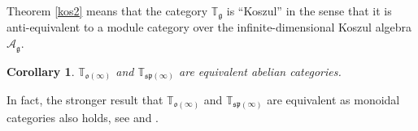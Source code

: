 \documentclass[10pt]{amsart}
\newcounter{theorem}
\newtheorem{corollary}[theo]{Corollary}
\newtheorem{prop}[theo]{Proposition}
\renewenvironment{proof}{ \emph{Proof}}{$\Box$}
\newcommand{\TT}{\mathbb{T}}
\renewcommand{\sp}{\mathfrak{sp}}
\renewcommand{\sl}{\mathfrak{sl}}
\newcommand{\oo}{\mathfrak{o}}
\newcommand{\hh}{\mathfrak{h}}
\renewcommand{\gg}{\mathfrak{g}}
\renewcommand {\phi} {\varphi}
\begin{document}
Theorem \ref{kos2} means that the category $\TT_\gg$ is ``Koszul'' in the sense that it is anti-equivalent to a module category over the infinite-dimensional 
Koszul algebra $\mathcal{A}_\gg$. 

\begin{corollary}
$\TT_{\oo(\infty)}$ and  $\TT_{\sp(\infty)}$ are equivalent abelian categories.
\end{corollary}

In fact, the stronger result that $\TT_{\oo(\infty)}$ and  $\TT_{\sp(\infty)}$ are equivalent as monoidal categories also holds, see \cite{SS} and \cite{S}.

\vspace{0.5cm}

% 
% 
\end{document}
